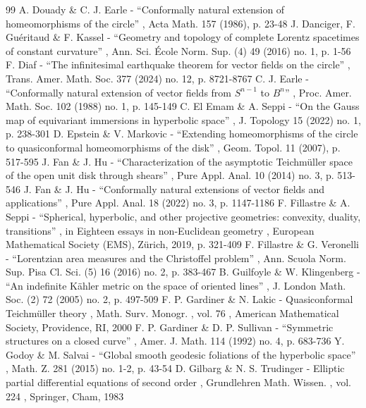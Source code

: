 \begin{thebibliography}{99}
 A. Douady \& C. J. Earle - “Conformally natural extension of homeomorphisms of the circle” , Acta Math. 157 (1986), p. 23-48
 J. Danciger, F. Guéritaud \& F. Kassel - “Geometry and topology of complete Lorentz spacetimes of constant curvature” , Ann. Sci. École Norm. Sup. (4) 49 (2016) no. 1, p. 1-56
 F. Diaf - “The infinitesimal earthquake theorem for vector fields on the circle” , Trans. Amer. Math. Soc. 377 (2024) no. 12, p. 8721-8767
 C. J. Earle - “Conformally natural extension of vector fields from $S^{n-1}$ to $B^{n}$” , Proc. Amer. Math. Soc. 102 (1988) no. 1, p. 145-149
 C. El Emam \& A. Seppi - “On the Gauss map of equivariant immersions in hyperbolic space” , J. Topology 15 (2022) no. 1, p. 238-301
 D. Epstein \& V. Markovic - “Extending homeomorphisms of the circle to quasiconformal homeomorphisms of the disk” , Geom. Topol. 11 (2007), p. 517-595
 J. Fan \& J. Hu - “Characterization of the asymptotic Teichmüller space of the open unit disk through shears” , Pure Appl. Anal. 10 (2014) no. 3, p. 513-546
 J. Fan \& J. Hu - “Conformally natural extensions of vector fields and applications” , Pure Appl. Anal. 18 (2022) no. 3, p. 1147-1186
 F. Fillastre \& A. Seppi - “Spherical, hyperbolic, and other projective geometries: convexity, duality, transitions” , in Eighteen essays in non-Euclidean geometry , European Mathematical Society (EMS), Zürich, 2019, p. 321-409
 F. Fillastre \& G. Veronelli - “Lorentzian area measures and the Christoffel problem” , Ann. Scuola Norm. Sup. Pisa Cl. Sci. (5) 16 (2016) no. 2, p. 383-467
 B. Guilfoyle \& W. Klingenberg - “An indefinite Kähler metric on the space of oriented lines” , J. London Math. Soc. (2) 72 (2005) no. 2, p. 497-509
 F. P. Gardiner \& N. Lakic - Quasiconformal Teichmüller theory , Math. Surv. Monogr. , vol. 76 , American Mathematical Society, Providence, RI, 2000
 F. P. Gardiner \& D. P. Sullivan - “Symmetric structures on a closed curve” , Amer. J. Math. 114 (1992) no. 4, p. 683-736
 Y. Godoy \& M. Salvai - “Global smooth geodesic foliations of the hyperbolic space” , Math. Z. 281 (2015) no. 1-2, p. 43-54
 D. Gilbarg \& N. S. Trudinger - Elliptic partial differential equations of second order , Grundlehren Math. Wissen. , vol. 224 , Springer, Cham, 1983

\end{thebibliography}
